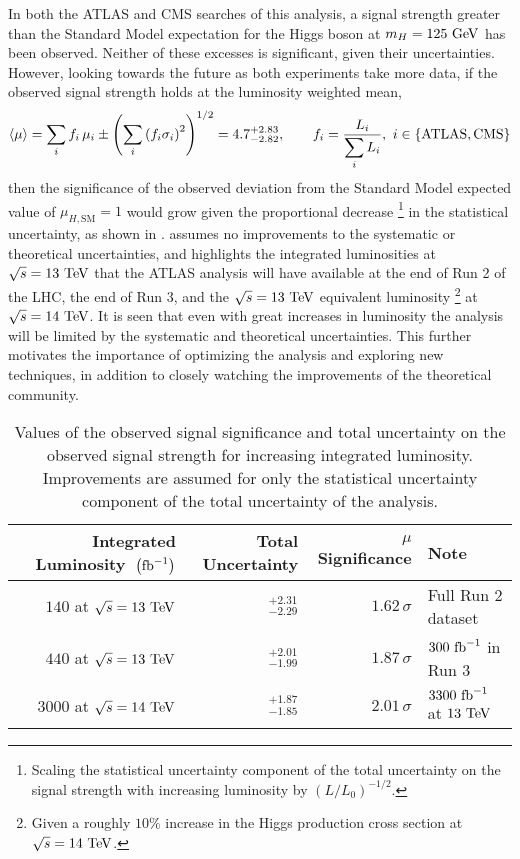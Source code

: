 In both the ATLAS and CMS searches of this analysis, a signal strength greater than the Standard Model expectation for the Higgs boson at $m_{H} = 125~\mathrm{GeV}$ has been observed.
Neither of these excesses is significant, given their uncertainties.
However, looking towards the future as both experiments take more data, if the observed signal strength holds at the luminosity weighted mean,
\[
 \braket{\mu} = \sum_{i} f_{i}\,\mu_{i} \pm \left(\sum_{i} \left(f_{i}\sigma_{i}\right)^{2}\right)^{1/2} = 4.7_{-2.82}^{+2.83}, \qquad f_{i} = \frac{L_{i}}{\displaystyle\sum_{i}L_{i}},~i \in \left\{\textrm{ATLAS}, \textrm{CMS}\right\}
\]
then the significance of the observed deviation from the Standard Model expected value of $\mu_{H, \textrm{SM}}=1$ would grow given the proportional decrease%
\footnote{Scaling the statistical uncertainty component of the total uncertainty on the signal strength with increasing luminosity by $\left(L/L_{0}\right)^{-1/2}$.}
in the statistical uncertainty, as shown in .
 assumes no improvements to the systematic or theoretical uncertainties, and highlights the integrated luminosities at $\sqrt{s}=13~\mathrm{TeV}$ that the ATLAS analysis will have available at the end of Run 2 of the LHC, the end of Run 3, and the $\sqrt{s}=13~\mathrm{TeV}$ equivalent luminosity%
\footnote{Given a roughly $10\%$ increase in the Higgs production cross section at $\sqrt{s}=14~\mathrm{TeV}$.}
at $\sqrt{s}=14~\mathrm{TeV}$.
It is seen that even with great increases in luminosity the analysis will be limited by the systematic and theoretical uncertainties.
This further motivates the importance of optimizing the analysis and exploring new techniques, in addition to closely watching the improvements of the theoretical community.

\begin{table}[htbp]
 \centering
 \caption[Values of the observed signal significance and total uncertainty on the observed signal strength for increasing integrated luminosity.]{%
  Values of the observed signal significance and total uncertainty on the observed signal strength for increasing integrated luminosity.
  Improvements are assumed for only the statistical uncertainty component of the total uncertainty of the analysis.}
 \label{table:signal_significance_lumi_scaling}
 \begin{tabular}{@{}rrrl@{}} \toprule
  Integrated Luminosity~$\left(\mathrm{fb}^{-1}\right)$ & Total Uncertainty  & $\mu$ Significance & Note                     \\ \midrule
  $140$ at $\sqrt{s}=13~\mathrm{TeV}$               & $_{-2.29}^{+2.31}$ & $1.62\,\sigma$     & Full Run 2 dataset       \\
  $440$ at $\sqrt{s}=13~\mathrm{TeV}$               & $_{-1.99}^{+2.01}$ & $1.87\,\sigma$     & $300~\mathrm{fb}^{-1}$ in Run 3      \\
  $3000$ at $\sqrt{s}=14~\mathrm{TeV}$              & $_{-1.85}^{+1.87}$ & $2.01\,\sigma$     & $3300~\mathrm{fb}^{-1}$ at $13~\mathrm{TeV}$ \\
  \bottomrule
 \end{tabular}
\end{table}

